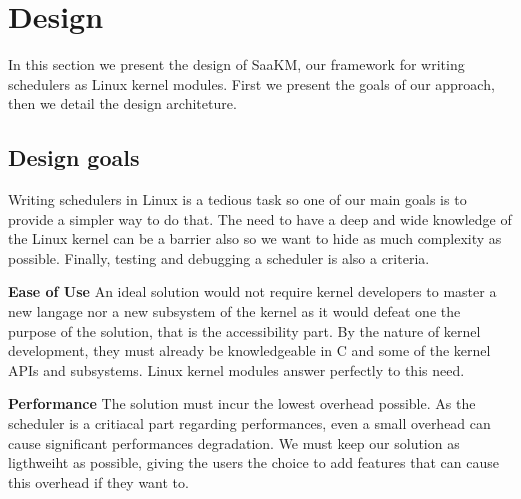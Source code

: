 \section{Design}
\label{sec:scheduler-as-a-kernel-module}



\par In this section we present the design of SaaKM, our framework for writing schedulers as Linux kernel modules. First we present the goals of our approach, then we detail the design architeture.\newline

\subsection{Design goals} Writing schedulers in Linux is a tedious task so one of our main goals is to provide a simpler way to do that. The need to have a deep and wide knowledge of the Linux kernel can be a barrier also so we want to hide as much complexity as possible. Finally, testing and debugging a scheduler is also a criteria.\newline

\textbf{Ease of Use} An ideal solution would not require kernel developers to master a new langage nor a new subsystem of the kernel as it would defeat one the purpose of the solution, that is the accessibility part. By the nature of kernel development, they must already be knowledgeable in C and some of the kernel APIs and subsystems. Linux kernel modules answer perfectly to this need.

\textbf{Performance} The solution must incur the lowest overhead possible. As the scheduler is a critiacal part regarding performances, even a small overhead can cause significant performances degradation. We must keep our solution as ligthweiht as possible, giving the users the choice to add features that can cause this overhead if they want to.\newline

